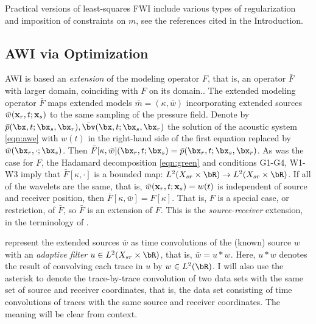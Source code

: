Practical versions of least-squares FWI include various types of regularization and
imposition of constraints on $m$, see the references cited in the
Introduction.

\subsection{AWI via Optimization}

AWI is based an {\em extension} of the modeling operator $F$, that is,
an operator ${\bar F}$ with larger domain, coinciding with $F$ on its domain..
The extended modeling operator ${\bar F}$ maps extended models
$\bar{m}=(\kappa,\bar{w})$ incorporating extended sources
$\bar{w}({\bf x}_r,t;{\bf x}_s)$ to the same sampling of the pressure
field. Denote by $\bar{p}(\bx,t;\bx_s,\bx_r), \bar{\bv}(\bx,t;\bx_s,\bx_r)$
the solution of the acoustic system \ref{eqn:awe} with $w(t)$ in the
right-hand side of the first equation replaced by
$\bar{w}(\bx_r,\cdot;\bx_s)$. Then
$\bar{F}[\kappa,\bar{w}](\bx_r,t;\bx_s) =
\bar{p}(\bx_r,t;\bx_s,\bx_r)$. As was the case for $F$, the Hadamard
decomposition \ref{eqn:green} and conditions G1-G4, W1-W3 imply that
$\bar{F}[\kappa, \cdot]$ is a bounded map: $L^2(X_{sr} \times \bR)
\rightarrow L^2(X_{sr} \times \bR)$. If all  
of the wavelets are the same, that is, ${\bar w}({\bf  
  x}_r,t;{\bf x}_s) = w(t)$ is independent of source and receiver  
position, then ${\bar F}[\kappa,\bar{w}] = F[\kappa]$. That is, $F$ is a special
case, or restriction, of ${\bar F}$, so ${\bar F}$ is an extension of
$F$. This is the {\em source-receiver} extension, in the terminology of \cite{HuangSymes2015SEG}.

\cite{Warner:16} represent the extended sources $\bar{w}$ as time convolutions of the
(known) source $w$ with an {\em adaptive filter} $u \in L^2(X_{sr}
\times \bR)$, that is, $\bar{w}=u * w$.
Here, $u*w$ denotes the result of convolving each trace in $u$ by $w
\in L^2(\bR)$. I
will also use the asterisk to denote the trace-by-trace convolution
of two data sets with the same set of source and receiver coordinates,
that is, the data set consisting of time convolutions of traces with the same source
and receiver coordinates. The meaning will be clear from context.

